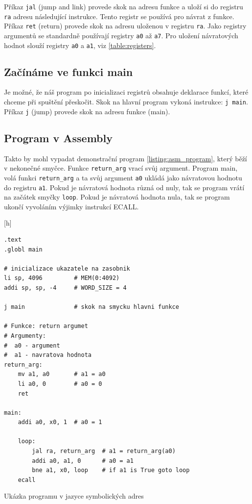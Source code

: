 \documentclass[FM,BP]{tulthesis}
\newcommand{\argument}[1]{{\ttfamily\color{\tulcolor}#1}}
\newcommand{\argumentindex}[1]{\argument{#1}\index{#1}}
\newenvironment{myquote}{\begin{list}{}{\setlength\leftmargin\parindent}\item[]}{\end{list}}
\newenvironment{listing}{\begin{myquote}\color{\tulcolor}}{\end{myquote}}
\begin{document}
Příkaz \verb|jal| (jump and link) provede skok na adresu funkce a uloží si do registru \verb|ra| adresu následující instrukce. Tento registr se používá pro návrat z funkce. Příkaz \verb|ret| (return) provede skok na adresu uloženou v registru \verb|ra|. Jako registry argumentů se standardně používají registry \verb|a0| až \verb|a7|. Pro uložení návratových hodnot slouží registry \verb|a0| a \verb|a1|, viz \ref{table:registers}.

\subsection{Začínáme ve funkci main}
Je možné, že náš program po inicializaci registrů obsahuje deklarace funkcí, které chceme při spuštění přeskočit. Skok na hlavní program vykoná instrukce: \verb|j main|. Příkaz \verb|j| (jump) provede skok na adresu funkce (main). 

\newpage

\subsection{Program v Assembly}
Takto by mohl vypadat demonstrační program \ref{listing:asm_program}, který běží v nekonečné smyčce. Funkce \verb|return_arg| vrací svůj argument. Program main, volá funkci \verb|return_arg| a ta svůj argument \verb|a0| ukládá jako návratovou hodnotu do registru \verb|a1|. Pokud je návratová hodnota různá od nuly, tak se program vrátí na začátek smyčky \verb|loop|. Pokud je návratová hodnota nula, tak se program ukončí vyvoláním výjimky instrukcí \argumentindex{ECALL}.

\begin{listing}[h]
    \begin{verbatim}
.text
.globl main

# inicializace ukazatele na zasobnik
li sp, 4096         # MEM(0:4092)
addi sp, sp, -4     # WORD_SIZE = 4

j main              # skok na smycku hlavni funkce

# Funkce: return argumet
# Argumenty:
#  a0 - argument
#  a1 - navratova hodnota
return_arg:
    mv a1, a0       # a1 = a0
    li a0, 0        # a0 = 0
    ret

main:
    addi a0, x0, 1  # a0 = 1

    loop:
        jal ra, return_arg  # a1 = return_arg(a0)
        addi a0, a1, 0      # a0 = a1
        bne a1, x0, loop    # if a1 is True goto loop
    ecall
    \end{verbatim}
    \caption{Ukázka programu v jazyce symbolických adres}
    \label{listing:asm_program}
\end{listing}
\end{document}
